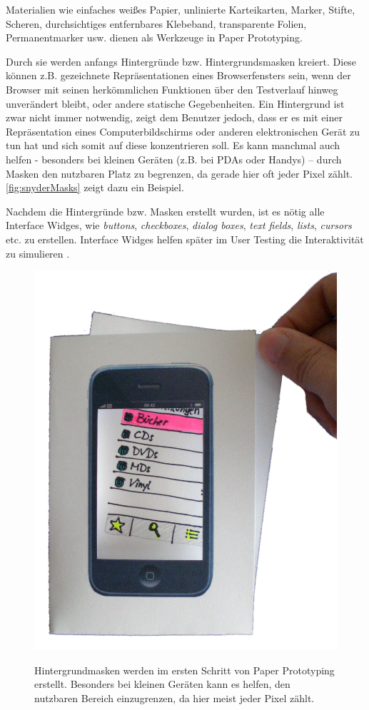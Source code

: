 \medskip Materialien wie einfaches weißes Papier, unlinierte Karteikarten, Marker, Stifte, Scheren, durchsichtiges entfernbares Klebeband, transparente Folien, Permanentmarker usw. dienen als Werkzeuge in Paper Prototyping.

Durch sie werden anfangs Hintergründe bzw.  Hintergrundsmasken kreiert. Diese können z.B. gezeichnete Repräsentationen eines Browserfensters sein, wenn der Browser mit seinen herkömmlichen Funktionen über den Testverlauf hinweg unverändert bleibt, oder andere statische Gegebenheiten. Ein Hintergrund ist zwar nicht immer notwendig, zeigt dem Benutzer jedoch, dass er es mit einer Repräsentation eines Computerbildschirms oder anderen elektronischen Gerät zu tun hat und sich somit auf diese konzentrieren soll. Es kann manchmal auch helfen - besonders bei kleinen Geräten (z.B. bei PDAs oder Handys) – durch Masken den nutzbaren Platz zu begrenzen, da gerade hier oft jeder Pixel zählt. \autoref{fig:snyderMasks} zeigt dazu ein Beispiel. 

Nachdem die Hintergründe bzw. Masken erstellt wurden, ist es nötig alle Interface Widges, wie \emph{buttons}, \emph{checkboxes}, \emph{dialog boxes}, \emph{text fields}, \emph{lists}, \emph{cursors} etc. zu erstellen. Interface Widges helfen später im User Testing die Interaktivität zu simulieren \citep{Snyder:2003}.

\begin{figure}
	\begin{center}
        {\includegraphics[width=.7\linewidth]{gfx/snyderMasks}}
	\end{center}
		\caption[Hintergrundmasken \newline \citep{Snyder:2003}]{Hintergrundmasken werden im ersten Schritt von Paper Prototyping erstellt. Besonders bei kleinen Geräten kann es helfen, den nutzbaren Bereich einzugrenzen, da hier meist jeder Pixel zählt.}\label{fig:snyderMasks}
\end{figure}

